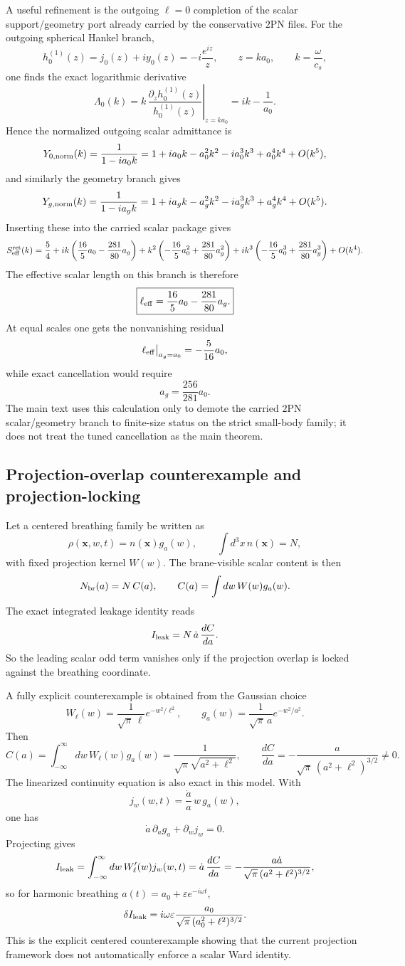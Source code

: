 \documentclass[11pt]{article}
\begin{document}
A useful refinement is the outgoing $\ell=0$ completion of the scalar
support/geometry port already carried by the conservative $2$PN files.  For the
outgoing spherical Hankel branch,
\[
h_0^{(1)}(z)=j_0(z)+iy_0(z)=-i\frac{e^{iz}}{z},
\qquad z=ka_0,
\qquad k=\frac{\omega}{c_s},
\]
one finds the exact logarithmic derivative
\[
\Lambda_0(k)
=
\left.k\,\frac{\partial_z h_0^{(1)}(z)}{h_0^{(1)}(z)}\right|_{z=ka_0}
=
ik-\frac{1}{a_0}.
\]
Hence the normalized outgoing scalar admittance is
\[
Y_{0,\rm norm}(k)
=
\frac{1}{1-ia_0k}
=
1+ia_0k-a_0^2k^2-ia_0^3k^3+a_0^4k^4+O(k^5),
\]
and similarly the geometry branch gives
\[
Y_{g,\rm norm}(k)
=
\frac{1}{1-ia_gk}
=
1+ia_gk-a_g^2k^2-ia_g^3k^3+a_g^4k^4+O(k^5).
\]
Inserting these into the carried scalar package gives
\[
S_{\rm eff}^{\rm ret}(k)
=
\frac54
+
ik\left(\frac{16}{5}a_0-\frac{281}{80}a_g\right)
+
k^2\left(-\frac{16}{5}a_0^2+\frac{281}{80}a_g^2\right)
+
ik^3\left(-\frac{16}{5}a_0^3+\frac{281}{80}a_g^3\right)
+
O(k^4).
\]
The effective scalar length on this branch is therefore
\[
\boxed{
\ell_{\rm eff}=\frac{16}{5}a_0-\frac{281}{80}a_g.
}
\]
At equal scales one gets the nonvanishing residual
\[
\ell_{\rm eff}\big|_{a_g=a_0}=-\frac{5}{16}a_0,
\]
while exact cancellation would require
\[
a_g=\frac{256}{281}a_0.
\]
The main text uses this calculation only to demote the carried $2$PN
scalar/geometry branch to finite-size status on the strict small-body family;
it does not treat the tuned cancellation as the main theorem.

\subsection{Projection-overlap counterexample and projection-locking}
\label{app:scalar-ledger-projection}

Let a centered breathing family be written as
\[
\rho(\mathbf x,w,t)=n(\mathbf x)g_a(w),
\qquad
\int d^3x\,n(\mathbf x)=N,
\]
with fixed projection kernel $W(w)$.  The brane-visible scalar content is then
\[
N_{\rm br}(a)=N\,C(a),
\qquad
C(a)=\int dw\,W(w)g_a(w).
\]
The exact integrated leakage identity reads
\[
I_{\rm leak}=N\,\dot a\,\frac{dC}{da}.
\]
So the leading scalar odd term vanishes only if the projection overlap is locked
against the breathing coordinate.

A fully explicit counterexample is obtained from the Gaussian choice
\[
W_\ell(w)=\frac{1}{\sqrt\pi\,\ell}e^{-w^2/\ell^2},
\qquad
g_a(w)=\frac{1}{\sqrt\pi\,a}e^{-w^2/a^2}.
\]
Then
\[
C(a)=\int_{-\infty}^{\infty}dw\,W_\ell(w)g_a(w)
=
\frac{1}{\sqrt\pi\sqrt{a^2+\ell^2}},
\qquad
\frac{dC}{da}=-\frac{a}{\sqrt\pi\,(a^2+\ell^2)^{3/2}}\neq0.
\]
The linearized continuity equation is also exact in this model.  With
\[
j_w(w,t)=\frac{\dot a}{a}\,w\,g_a(w),
\]
one has
\[
\dot a\,\partial_a g_a+\partial_w j_w=0.
\]
Projecting gives
\[
I_{\rm leak}
=
\int_{-\infty}^{\infty}dw\,W_\ell'(w)j_w(w,t)
=
\dot a\,\frac{dC}{da}
=
-
\frac{a\dot a}{\sqrt\pi\,(a^2+\ell^2)^{3/2}},
\]
so for harmonic breathing $a(t)=a_0+\varepsilon e^{-i\omega t}$,
\[
\delta I_{\rm leak}
=
 i\omega\varepsilon
 \frac{a_0}{\sqrt\pi\,(a_0^2+\ell^2)^{3/2}}.
\]
This is the explicit centered counterexample showing that the current projection
framework does not automatically enforce a scalar Ward identity.
\end{document}
